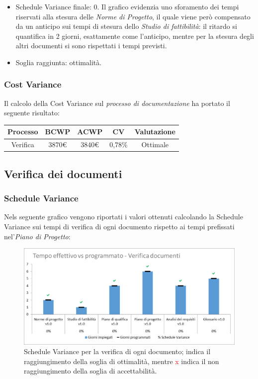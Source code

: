\begin{itemize}
	\item Schedule Variance finale: 0. 
	Il grafico evidenzia uno sforamento dei tempi riservati alla stesura delle \emph{Norme di Progetto}, il quale viene però compensato da un anticipo sui tempi di stesura dello \emph{Studio di fattibilità}: il ritardo si quantifica in 2 giorni, esattamente come l'anticipo, mentre per la stesura degli altri documenti si sono rispettati i tempi previsti. 
	
	\item Soglia raggiunta: ottimalità.
\end{itemize}

\subsubsection{Cost Variance}
Il calcolo della Cost Variance sul \emph{processo di documentazione} ha portato il seguente risultato: 

{
\renewcommand{\arraystretch}{2}
\centering
\begin{tabular}{| c | c | c | c | c |}
	\hline
	\textbf{Processo} & \textbf{BCWP} & \textbf{ACWP} & \textbf{CV} & \textbf{Valutazione} \\
	\hline
	Verifica & 3870\euro & 3840\euro & 0,78\% & Ottimale \\
	\hline
\end{tabular}

}


\subsection{Verifica dei documenti}
\subsubsection{Schedule Variance}
Nels seguente grafico vengono riportati i valori ottenuti calcolando la Schedule Variance sui tempi di verifica di ogni documento rispetto ai tempi prefissati nel'\textit{Piano di Progetto}:

\begin{figure}[h!]
	\centering
	\includegraphics[scale=0.75]{img/Grafici/SV-VerDocumenti.png}
	\caption{Schedule Variance per la verifica di ogni documento; \textcolor{green}{\checkmark} indica il raggiungimento della soglia di ottimalità, mentre \textcolor{red}{x} indica il non raggiungimento della soglia di accettabilità.}
	\label{fig:SV-VerDocumenti}
\end{figure}


